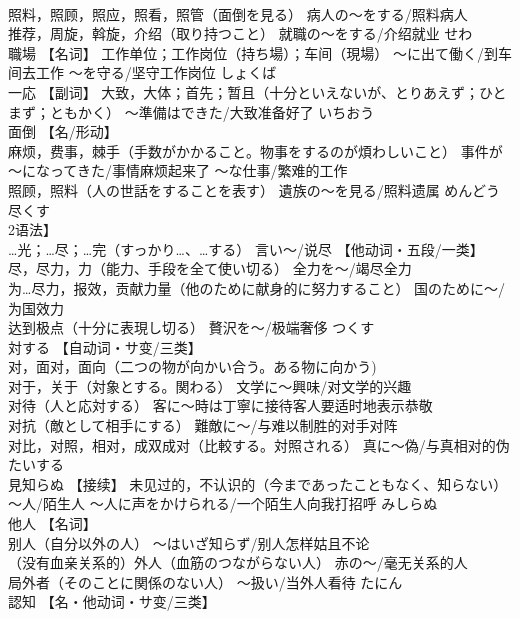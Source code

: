 \documentclass[8pt]{extreport}
\begin{document}
\begin{CJK}{UTF8}{min}
\\	照料，照顾，照应，照看，照管（面倒を見る） 病人の～をする/照料病人 
\\	推荐，周旋，斡旋，介绍（取り持つこと） 就職の～をする/介绍就业	せわ	
\\	職場	【名词】 工作单位；工作岗位（持ち場）；车间（現場） ～に出て働く/到车间去工作 ～を守る/坚守工作岗位	しょくば	
\\	一応	【副词】 大致，大体；首先；暂且（十分といえないが、とりあえず；ひとまず；ともかく） ～準備はできた/大致准备好了	いちおう	
\\	面倒	【名/形动】 
\\	麻烦，费事，棘手（手数がかかること。物事をするのが煩わしいこと） 事件が～になってきた/事情麻烦起来了 ～な仕事/繁难的工作 
\\	照顾，照料（人の世話をすることを表す） 遺族の～を見る/照料遗属	めんどう	
\\	尽くす	
\\	2语法】 
\\	…光；…尽；…完（すっかり…、…する） 言い～/说尽 【他动词・五段/一类】 
\\	尽，尽力，力（能力、手段を全て使い切る） 全力を～/竭尽全力 
\\	为…尽力，报效，贡献力量（他のために献身的に努力すること） 国のために～/为国效力 
\\	达到极点（十分に表現し切る） 贅沢を～/极端奢侈	つくす	
\\	対する	【自动词・サ变/三类】 
\\	对，面对，面向（二つの物が向かい合う。ある物に向かう) 
\\	对于，关于（対象とする。関わる） 文学に～興味/对文学的兴趣 
\\	对待（人と応対する） 客に～時は丁寧に接待客人要适时地表示恭敬 
\\	对抗（敵として相手にする） 難敵に～/与难以制胜的对手对阵 
\\	对比，对照，相对，成双成对（比較する。対照される） 真に～偽/与真相对的伪	たいする	
\\	見知らぬ	【接续】 未见过的，不认识的（今まであったこともなく、知らない） ～人/陌生人 ～人に声をかけられる/一个陌生人向我打招呼	みしらぬ	
\\	他人	【名词】 
\\	别人（自分以外の人） ～はいざ知らず/别人怎样姑且不论 
\\	（没有血亲关系的）外人（血筋のつながらない人） 赤の～/毫无关系的人 
\\	局外者（そのことに関係のない人） ～扱い/当外人看待	たにん	
\\	認知	【名・他动词・サ变/三类】 

\end{CJK}
\end{document}
